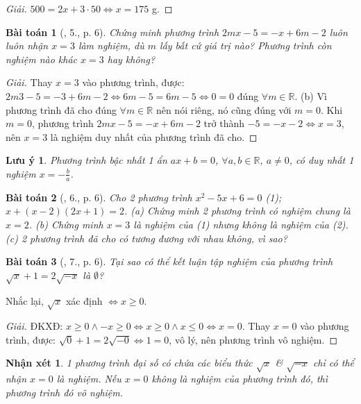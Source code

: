\documentclass{article}
\newtheorem{baitoan}{Bài toán}
\newtheorem{luuy}{Lưu ý}
\newtheorem{nhanxet}{Nhận xét}
\begin{document}
\begin{proof}[Giải]
	$500 = 2x + 3\cdot50\Leftrightarrow x = 175$ g.
\end{proof}

\begin{baitoan}[\cite{SBT_Toan_8_tap_2}, 5., p. 6]
	Chứng minh phương trình $2mx - 5 = -x + 6m - 2$ luôn luôn nhận $x = 3$ làm nghiệm, dù $m$ lấy bất cứ giá trị nào? Phương trình còn nghiệm nào khác $x = 3$ hay không?
\end{baitoan}

\begin{proof}[Giải]
	Thay $x = 3$ vào phương trình, được: $2m3 - 5 = -3 + 6m - 2\Leftrightarrow6m - 5 = 6m - 5\Leftrightarrow0 = 0$ đúng $\forall m\in\mathbb{R}$. (b) Vì phương trình đã cho đúng $\forall m\in\mathbb{R}$ nên nói riêng, nó cũng đúng với $m = 0$. Khi $m = 0$, phương trình $2mx - 5 = -x + 6m - 2$ trở thành $-5 = -x - 2\Leftrightarrow x = 3$, nên $x = 3$ là nghiệm duy nhất của phương trình đã cho.
\end{proof}

\begin{luuy}
	Phương trình bậc nhất 1 ẩn $ax + b = 0$, $\forall a,b\in\mathbb{R}$, $a\ne0$, có duy nhất 1 nghiệm $x = -\frac{b}{a}$.
\end{luuy}

\begin{baitoan}[\cite{SBT_Toan_8_tap_2}, 6., p. 6]
	Cho 2 phương trình $x^2 - 5x + 6 = 0$ (1); $x + (x - 2)(2x + 1) = 2$. (a) Chứng minh 2 phương trình có nghiệm chung là $x = 2$. (b) Chứng minh $x = 3$ là nghiệm của (1) nhưng không là nghiệm của (2). (c) 2 phương trình đã cho có tương đương với nhau không, vì sao?
\end{baitoan}

\begin{baitoan}[\cite{SBT_Toan_8_tap_2}, 7., p. 6]
	Tại sao có thể kết luận tập nghiệm của phương trình $\sqrt{x} + 1 = 2\sqrt{-x}$ là $\emptyset$?
\end{baitoan}
Nhắc lại, $\sqrt{x}$ xác định $\Leftrightarrow x\ge 0$.
\begin{proof}[Giải]
	ĐKXĐ: $x\ge 0\land-x\ge 0\Leftrightarrow x\ge 0\land x\le0\Leftrightarrow x = 0$. Thay $x = 0$ vào phương trình, được: $\sqrt{0} + 1 = 2\sqrt{-0}\Leftrightarrow 1 = 0$, vô lý, nên phương trình vô nghiệm.
\end{proof}

\begin{nhanxet}
	1 phương trình đại số có chứa các biểu thức $\sqrt{x}$ \& $\sqrt{-x}$ chỉ có thể nhận $x = 0$ là nghiệm. Nếu $x = 0$ không là nghiệm của phương trình đó, thì phương trình đó vô nghiệm.
\end{nhanxet}
\end{document}
